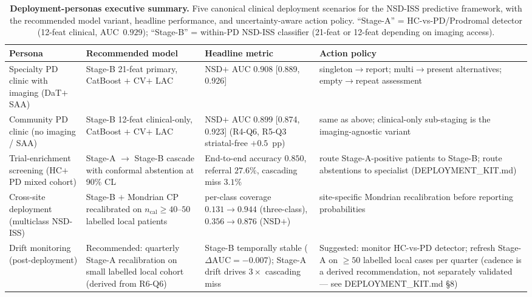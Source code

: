 \begin{table}[!t]
\caption{\textbf{Deployment-personas executive summary.} Five canonical clinical deployment scenarios for the NSD-ISS predictive framework, with the recommended model variant, headline performance, and uncertainty-aware action policy. ``Stage-A'' = HC-vs-PD/Prodromal detector (12-feat clinical, AUC~$0.929$); ``Stage-B'' = within-PD NSD-ISS classifier (21-feat or 12-feat depending on imaging access).}
\label{p1:tab:deployment-personas}
\centering
\footnotesize
\setlength{\tabcolsep}{3pt}
\begin{tabular}{@{}p{2.4cm}p{2.6cm}p{2.0cm}p{2.0cm}@{}}
\toprule
\textbf{Persona} & \textbf{Recommended model} & \textbf{Headline metric} & \textbf{Action policy} \\
\midrule
Specialty PD clinic with imaging (DaT$+$SAA) & Stage-B 21-feat primary, CatBoost $+$ CV$+$ LAC & NSD$+$ AUC $0.908$ [0.889, 0.926] & singleton$\to$report; multi$\to$present alternatives; empty$\to$repeat assessment \\
\midrule
Community PD clinic (no imaging / SAA) & Stage-B 12-feat clinical-only, CatBoost $+$ CV$+$ LAC & NSD$+$ AUC $0.899$ [0.874, 0.923] (R4-Q6, R5-Q3 striatal-free $+0.5$~pp) & same as above; clinical-only sub-staging is the imaging-agnostic variant \\
\midrule
Trial-enrichment screening (HC$+$PD mixed cohort) & Stage-A $\to$ Stage-B cascade with conformal abstention at 90\% CL & End-to-end accuracy $0.850$, referral $27.6\%$, cascading miss $3.1\%$ & route Stage-A-positive patients to Stage-B; route abstentions to specialist (DEPLOYMENT\_KIT.md) \\
\midrule
Cross-site deployment (multiclass NSD-ISS) & Stage-B $+$ Mondrian CP recalibrated on $n_{\mathrm{cal}}{\geq}40$--$50$ labelled local patients & per-class coverage $0.131 \to 0.944$ (three-class), $0.356 \to 0.876$ (NSD$+$) & site-specific Mondrian recalibration before reporting probabilities \\
\midrule
Drift monitoring (post-deployment) & Recommended: quarterly Stage-A recalibration on small labelled local cohort (derived from R6-Q6) & Stage-B temporally stable ($\Delta\mathrm{AUC} = -0.007$); Stage-A drift drives $3{\times}$ cascading miss & Suggested: monitor HC-vs-PD detector; refresh Stage-A on $\geq 50$ labelled local cases per quarter (cadence is a derived recommendation, not separately validated --- see DEPLOYMENT\_KIT.md §8) \\
\bottomrule
\end{tabular}
\end{table}

